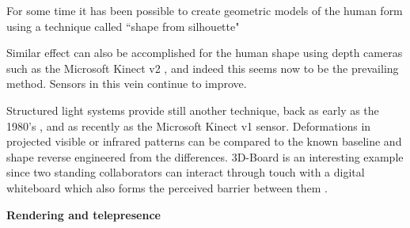                 For some time it has been possible to create geometric models of the human form using a technique called ``shape from silhouette" \cite{Allard2006, Petit:2008tva,Matusik2000,Starck2008,Franco2003,Baumgart1975,Laurentini1994a,Grau2007,Waizenegger2011,Franco2009,Feldmann2009,Cooke2000, Starck2003}\par
                Similar effect can also be accomplished for the human shape using depth cameras such as the Microsoft Kinect v2 \cite{Maimone2011}, and indeed this seems now to be the prevailing method. Sensors in this vein continue to improve.\par
       Structured light systems provide still another technique, back as early as the 1980's \cite{Hu:1986ww}, and as recently as the Microsoft Kinect v1 sensor. Deformations in projected visible or infrared patterns can be compared to the known baseline and shape reverse engineered from the differences. 3D-Board is an interesting example since two standing collaborators can interact through touch with a digital whiteboard which also forms the perceived barrier between them \cite{Zillner2014}.\par
       \textbf{Rendering and telepresence}
       
